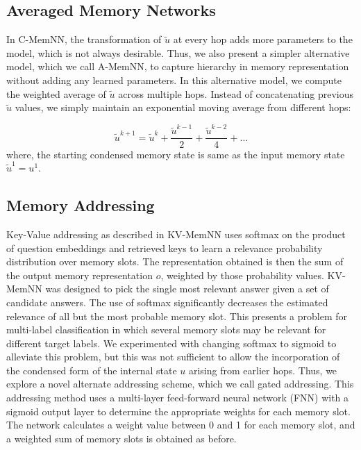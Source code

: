             
            
\subsection{Averaged Memory Networks}

In C-MemNN, the transformation of $\widetilde{u}$ at every hop adds more parameters to the model, which is not always desirable. Thus, we also present a simpler alternative model, which we call A-MemNN, to capture hierarchy in memory representation without adding any learned parameters. In this alternative model, we compute the weighted average of $\widetilde{u}$ across multiple hops. Instead of concatenating previous $\widetilde{u}$ values, we simply maintain an exponential moving average from different hops: 

    \begin{equation}
         \widetilde{u}^{k+1} =  \widetilde{u}^{k} +  \frac{\widetilde{u}^{k-1}}{2}  + \frac{\widetilde{u}^{k-2}}{4} + \ldots
    \end{equation}
    where, the starting condensed memory state is same as the input memory state $\widetilde{u}^1 = u^1$.
    
    
    \subsection{Memory Addressing}

    Key-Value addressing as described in KV-MemNN uses softmax on the product of question embeddings and retrieved keys to learn a relevance probability distribution over memory slots. The representation obtained is then the sum of the output memory representation $o$, weighted by those probability values. KV-MemNN was designed to pick the single most relevant answer given a set of candidate answers. The use of softmax significantly decreases the estimated relevance of all but the most probable memory slot.  This presents a problem for multi-label classification in which several memory slots may be relevant for different target labels.  We experimented with changing softmax to sigmoid to alleviate this problem, but this was not sufficient to allow the incorporation of the condensed form of the internal state $u$ arising from earlier hops. Thus, we explore a novel alternate addressing scheme, which we call gated addressing.  This addressing method uses a multi-layer feed-forward neural network (FNN) with a sigmoid output layer to determine the appropriate weights for each memory slot.  The network calculates a weight value between 0 and 1 for each memory slot, and a weighted sum of memory slots is obtained as before.




